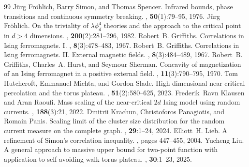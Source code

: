 \documentclass[10pt,a4paper]{amsart}
\numberwithin{equation}{section}
\begin{document}
\begin{thebibliography}{99}
 J{\"u}rg Fr{\"o}hlich, Barry Simon, and Thomas Spencer. \newblock Infrared bounds, phase transitions and continuous symmetry breaking. , \textup{\textbf{50}}(1):79--95, 1976.
 J{\"u}rg Fr{\"o}hlich. \newblock On the triviality of $\lambda\phi_d^4$ theories and the approach to the critical point in $d>4$ dimensions. , \textbf{200}(2):281--296, 1982.
 Robert~B. Griffiths. \newblock Correlations in {I}sing ferromagnets. {I}. , \textbf{8}(3):478--483, 1967.
 Robert~B. Griffiths. \newblock Correlations in {I}sing ferromagnets. {II}. {E}xternal magnetic fields. , \textbf{8}(3):484--489, 1967.
 Robert~B. Griffiths, Charles~A. Hurst, and Seymour Sherman. \newblock Concavity of magnetization of an {I}sing ferromagnet in a positive external field. , \textbf{11}(3):790--795, 1970.
 Tom Hutchcroft, Emmanuel Michta, and Gordon Slade. \newblock High-dimensional near-critical percolation and the torus plateau. , \textbf{51}(2):580--625, 2023.
 Frederik~Ravn Klausen and Aran Raoufi. \newblock Mass scaling of the near-critical $2d$ {I}sing model using random currents. , \textbf{188}(3):21, 2022.
 Dmitrii Krachun, Christoforos Panagiotis, and Romain Panis. \newblock Scaling limit of the cluster size distribution for the random current measure on the complete graph. , \textbf{29}:1--24, 2024.
 Elliott~H. Lieb. \newblock A refinement of {S}imon’s correlation inequality. , pages 447--455, 2004.
 Yucheng Liu. \newblock A general approach to massive upper bound for two-point function with application to self-avoiding walk torus plateau. , \textbf{30}:1--23, 2025.

\end{thebibliography}
\end{document}
